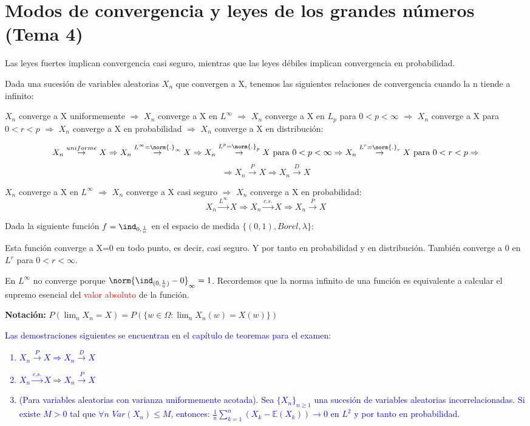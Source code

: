 \documentclass{apuntes}
\begin{document}
\chapter{Modos de convergencia y leyes de los grandes números (Tema 4)}
Las leyes fuertes implican convergencia casi seguro, mientras que las leyes débiles implican convergencia en probabilidad.

Dada una sucesión de variables aleatorias $X_n$ que convergen a X, tenemos las siguientes relaciones de convergencia cuando la n tiende a infinito:

$X_n$ converge a X uniformemente  $\Rightarrow$ $X_n$ converge a X en $L^{\infty}$  $\Rightarrow$ $X_n$ converge a X en $L_p$ para $0<p<\infty$  $\Rightarrow$ $X_n$ converge a X para $0<r<p$  $\Rightarrow$ $X_n$ converge a X en probabilidad  $\Rightarrow$ $X_n$ converge a X en distribución:

\[
X_n \stackrel{uniforme}{\rightarrow} X \Rightarrow X_n \stackrel{L^{\infty}=\norm{.}_{\infty}}{\rightarrow} X \Rightarrow X_n \stackrel{L^p=\norm{.}_p}{\rightarrow} X \text{ para } 0<p<\infty \Rightarrow  X_n \stackrel{L^r=\norm{.}_r}{\rightarrow} X \text{ para } 0<r<p \Rightarrow
\]
\[
\Rightarrow X_n \stackrel{P}{\rightarrow} X \Rightarrow X_n \stackrel{D}{\rightarrow} X
\]

$X_n$ converge a X en $L^{\infty}$ $\Rightarrow$ $X_n$ converge a X casi seguro $\Rightarrow$ $X_n$ converge a X en probabilidad:
\[
X_n \stackrel{L^{\infty}}{\rightarrow} X \Rightarrow X_n \stackrel{c.s.}{\rightarrow} X \Rightarrow X_n \stackrel{P}{\rightarrow} X
\]

\begin{example}
Dada la siguiente función $f=\ind_{0,\frac{1}{n}}$ en el espacio de medida $\{(0,1), Borel, \lambda\}$:

Esta función converge a X=0 en todo punto, es decir, casi seguro. Y por tanto en probabilidad y en distribución. También converge a 0 en $L^r$ para $0<r<\infty$.

En $L^{\infty}$ no converge porque $\norm{\ind_{(0, \frac{1}{n})}-0}_{\infty} = 1$. Recordemos que la norma infinito de una función es equivalente a calcular el supremo esencial del \textcolor{red}{valor absoluto} de la función.
\end{example}

\textbf{Notación:} $P(\lim_n X_n=X) = P(\{w \in \Omega: \lim_n X_n(w)=X(w)\})$

\textcolor{blue}{Las demostraciones siguientes se encuentran en el capítulo de teoremas para el examen:
\begin{enumerate}
\item $X_n \stackrel{P}{\rightarrow} X  \Rightarrow X_n \stackrel{D}{\rightarrow} X$
\item $X_n \stackrel{c.s.}{\rightarrow} X  \Rightarrow X_n \stackrel{P}{\rightarrow} X$
\item (Para variables aleatorias con varianza uniformemente acotada). Sea $\{X_n\}_{n\geq 1}$ una sucesión de variables aleatorias incorrelacionadas. Si existe $M>0$ tal que $\forall n$ $Var(X_n)\leq M$, entonces: $\frac{1}{n}\sum_{k=1}^{n}(X_k -\mathbb{E}(X_k)) \rightarrow 0$ en $L^2$ y por tanto en probabilidad.
\end{enumerate}}
\end{document}

